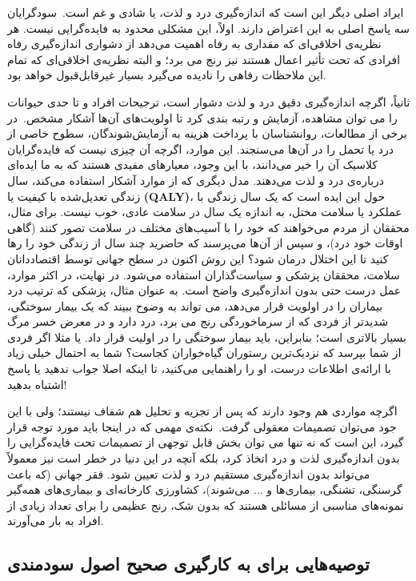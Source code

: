 ایراد اصلی دیگر این است که اندازه‌گیری درد و لذت، یا شادی و غم است.\     سودگرایان سه پاسخ اصلی به این اعتراض دارند.
اولاً، این مشکلی محدود به فایده‌گرایی نیست.
هر نظریه‌ی اخلاقی‌ای که مقداری به رفاه اهمیت می‌دهد از دشواری اندازه‌گیری رفاه افرادی که تحت تأثیر اعمال هستند نیز رنج می برد؛ و البته نظریه‌ی اخلاقی‌ای که تمام این ملاحظات رفاهی را نادیده می‌گیرد بسیار غیرقابل‌قبول خواهد بود.

ثانیاً، اگرچه اندازه‌گیری دقیق درد و لذت دشوار است، ترجیحات افراد و تا حدی حیوانات را می توان مشاهده، آزمایش و رتبه بندی کرد تا اولویت‌های آن‌ها آشکار مشخص.\     در برخی از مطالعات، روانشناسان با پرداخت هزینه به آزمایش‌شوندگان، سطوح خاصی از درد یا تحمل را در آن‌ها می‌سنجند.
این موارد، اگرچه آن چیزی نیست که فایده‌گرایان کلاسیک آن را خیر می‌دانند، با این وجود، معیارهای مفیدی هستند که به ما ایده‌ای درباره‌ی درد و لذت می‌دهند.
مدل دیگری که از موارد آشکار استفاده می‌کند، سال زندگی تعدیل‌شده با کیفیت یا \textenglish{\textbf{(QALY)}}، حول این ایده است که یک سال زندگی با عملکرد یا سلامت مختل، به اندازه یک سال در سلامت عادی، خوب نیست.
برای مثال، محققان از مردم می‌خواهند که خود را با آسیب‌های مختلف در سلامت تصور کنند (گاهی اوقات خود درد)، و سپس از آن‌ها می‌پرسند که حاضرید چند سال از زندگی خود را رها کنید تا این اختلال درمان شود؟ این روش اکنون در سطح جهانی توسط اقتصاددانان سلامت، محققان پزشکی و سیاست‌گذاران استفاده می‌شود.
در نهایت، در اکثر موارد، عمل درست حتی بدون اندازه‌گیری واضح است.
به عنوان مثال، پزشکی که ترتیب درد بیماران را در اولویت قرار می‌دهد، می تواند به وضوح ببیند که یک بیمار سوختگی، شدیدتر از فردی که از سرماخوردگی رنج می برد، درد دارد و در معرض خسر مرگ بسیار بالاتری است؛ بنابراین، باید بیمار سوختگی را در اولیت قرار داد.
یا مثلا اگر فردی از شما بپرسد که نزدیک‌ترین رستوران گیاه‌خواران کجاست؟ شما به احتمال خیلی زیاد با ارائه‌ی اطلاعات درست، او را راهنمایی می‌کنید، تا اینکه اصلا جواب ندهید یا پاسخ اشتباه بدهید!

اگرچه مواردی هم وجود دارند که پس از تجزیه و تحلیل هم شفاف نیستند؛ ولی با این جود می‌توان تصمیمات معقولی گرفت.\     نکته‌ی مهمی که در اینجا باید مورد توجه قرار گیرد، این است که نه تنها می توان بخش قابل توجهی از تصمیمات تحت فایده‌گرایی را بدون اندازه‌گیری لذت و درد اتخاذ کرد، بلکه آنچه در این دنیا در خطر است نیز معمولاً می‌تواند بدون اندازه‌گیری مستقیم درد و لذت تعیین شود.
فقر جهانی (که باعث گرسنگی، تشنگی، بیماری‌ها و ... می‌شوند)، کشاورزی کارخانه‌ای و بیماری‌های همه‌گیر نمونه‌های مناسبی از مسائلی هستند که بدون شک، رنج عظیمی را برای تعداد زیادی از افراد به بار می‌آورند.


\subsection*{توصیه‌هایی برای به کارگیری صحیح اصول سودمندی}


